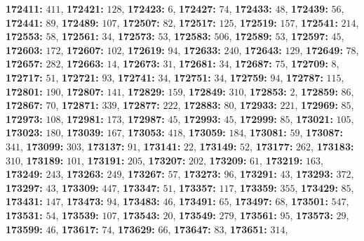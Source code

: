 \textsf{\bfseries 172411:} $411$, \textsf{\bfseries 172421:} $128$, \textsf{\bfseries 172423:} $6$, \textsf{\bfseries 172427:} $74$, \textsf{\bfseries 172433:} $48$, \textsf{\bfseries 172439:} $56$, \textsf{\bfseries 172441:} $89$, \textsf{\bfseries 172489:} $107$, \textsf{\bfseries 172507:} $82$, \textsf{\bfseries 172517:} $125$, \textsf{\bfseries 172519:} $157$, \textsf{\bfseries 172541:} $214$, \textsf{\bfseries 172553:} $58$, \textsf{\bfseries 172561:} $34$, \textsf{\bfseries 172573:} $53$, \textsf{\bfseries 172583:} $506$, \textsf{\bfseries 172589:} $53$, \textsf{\bfseries 172597:} $45$, \textsf{\bfseries 172603:} $172$, \textsf{\bfseries 172607:} $102$, \textsf{\bfseries 172619:} $94$, \textsf{\bfseries 172633:} $240$, \textsf{\bfseries 172643:} $129$, \textsf{\bfseries 172649:} $78$, \textsf{\bfseries 172657:} $282$, \textsf{\bfseries 172663:} $14$, \textsf{\bfseries 172673:} $31$, \textsf{\bfseries 172681:} $34$, \textsf{\bfseries 172687:} $75$, \textsf{\bfseries 172709:} $8$, \textsf{\bfseries 172717:} $51$, \textsf{\bfseries 172721:} $93$, \textsf{\bfseries 172741:} $34$, \textsf{\bfseries 172751:} $34$, \textsf{\bfseries 172759:} $94$, \textsf{\bfseries 172787:} $115$, \textsf{\bfseries 172801:} $190$, \textsf{\bfseries 172807:} $141$, \textsf{\bfseries 172829:} $159$, \textsf{\bfseries 172849:} $310$, \textsf{\bfseries 172853:} $2$, \textsf{\bfseries 172859:} $86$, \textsf{\bfseries 172867:} $70$, \textsf{\bfseries 172871:} $339$, \textsf{\bfseries 172877:} $222$, \textsf{\bfseries 172883:} $80$, \textsf{\bfseries 172933:} $221$, \textsf{\bfseries 172969:} $85$, \textsf{\bfseries 172973:} $108$, \textsf{\bfseries 172981:} $173$, \textsf{\bfseries 172987:} $45$, \textsf{\bfseries 172993:} $45$, \textsf{\bfseries 172999:} $85$, \textsf{\bfseries 173021:} $105$, \textsf{\bfseries 173023:} $180$, \textsf{\bfseries 173039:} $167$, \textsf{\bfseries 173053:} $418$, \textsf{\bfseries 173059:} $184$, \textsf{\bfseries 173081:} $59$, \textsf{\bfseries 173087:} $341$, \textsf{\bfseries 173099:} $303$, \textsf{\bfseries 173137:} $91$, \textsf{\bfseries 173141:} $22$, \textsf{\bfseries 173149:} $52$, \textsf{\bfseries 173177:} $262$, \textsf{\bfseries 173183:} $310$, \textsf{\bfseries 173189:} $101$, \textsf{\bfseries 173191:} $205$, \textsf{\bfseries 173207:} $202$, \textsf{\bfseries 173209:} $61$, \textsf{\bfseries 173219:} $163$, \textsf{\bfseries 173249:} $243$, \textsf{\bfseries 173263:} $249$, \textsf{\bfseries 173267:} $57$, \textsf{\bfseries 173273:} $96$, \textsf{\bfseries 173291:} $43$, \textsf{\bfseries 173293:} $372$, \textsf{\bfseries 173297:} $43$, \textsf{\bfseries 173309:} $447$, \textsf{\bfseries 173347:} $51$, \textsf{\bfseries 173357:} $117$, \textsf{\bfseries 173359:} $355$, \textsf{\bfseries 173429:} $85$, \textsf{\bfseries 173431:} $147$, \textsf{\bfseries 173473:} $94$, \textsf{\bfseries 173483:} $46$, \textsf{\bfseries 173491:} $65$, \textsf{\bfseries 173497:} $68$, \textsf{\bfseries 173501:} $547$, \textsf{\bfseries 173531:} $54$, \textsf{\bfseries 173539:} $107$, \textsf{\bfseries 173543:} $20$, \textsf{\bfseries 173549:} $279$, \textsf{\bfseries 173561:} $95$, \textsf{\bfseries 173573:} $29$, \textsf{\bfseries 173599:} $46$, \textsf{\bfseries 173617:} $74$, \textsf{\bfseries 173629:} $66$, \textsf{\bfseries 173647:} $83$, \textsf{\bfseries 173651:} $314$, 
